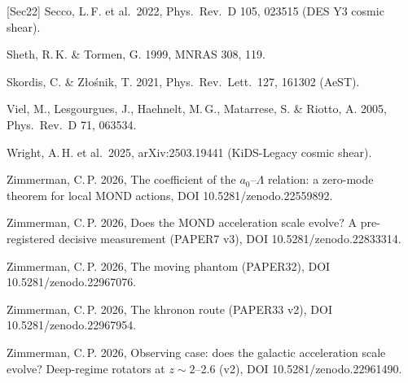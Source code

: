 \documentclass[10pt]{article}
\begin{document}
{[Sec22] Secco, L.\,F. et al.\ 2022, Phys.\ Rev.\ D 105, 023515 (DES Y3 cosmic shear).\par
[ST99] Sheth, R.\,K. \& Tormen, G. 1999, MNRAS 308, 119.\par
[SZ21] Skordis, C. \& Z\l o\'snik, T. 2021, Phys.\ Rev.\ Lett.\ 127, 161302 (AeST).\par
[Vie05] Viel, M., Lesgourgues, J., Haehnelt, M.\,G., Matarrese, S. \& Riotto, A. 2005, Phys.\ Rev.\ D 71, 063534.\par
[Wri25] Wright, A.\,H. et al.\ 2025, arXiv:2503.19441 (KiDS-Legacy cosmic shear).\par
[Z26a] Zimmerman, C.\,P. 2026, The coefficient of the $a_0$--$\Lambda$ relation: a zero-mode theorem for local MOND actions, DOI 10.5281/zenodo.22559892.\par
[Z26c] Zimmerman, C.\,P. 2026, Does the MOND acceleration scale evolve? A pre-registered decisive measurement (PAPER7 v3), DOI 10.5281/zenodo.22833314.\par
[Z26d] Zimmerman, C.\,P. 2026, The moving phantom (PAPER32), DOI 10.5281/zenodo.22967076.\par
[Z26e] Zimmerman, C.\,P. 2026, The khronon route (PAPER33 v2), DOI 10.5281/zenodo.22967954.\par
[Z26f] Zimmerman, C.\,P. 2026, Observing case: does the galactic acceleration scale evolve? Deep-regime rotators at $z\sim2$--2.6 (v2), DOI 10.5281/zenodo.22961490.\par
}
\end{document}
